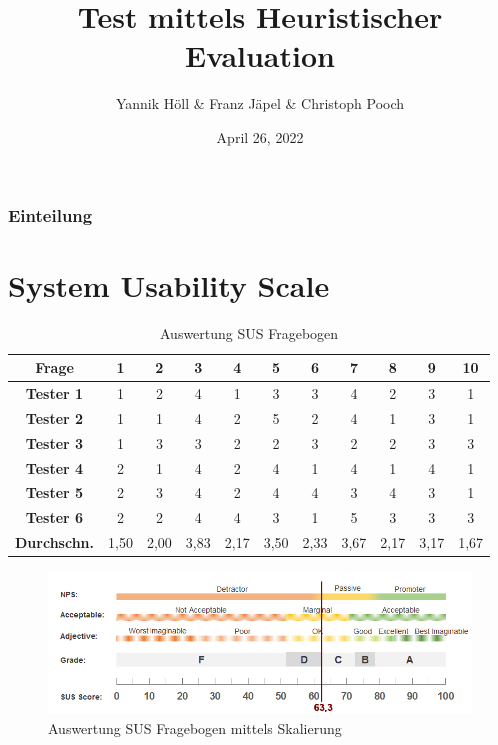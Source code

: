 \documentclass[12pt, aspectratio=169]{beamer}
\title{Test mittels Heuristischer Evaluation}
\author[Y. Höll, F. Jäpel, C. Pooch]{Yannik Höll \& Franz Jäpel \& Christoph Pooch}
\date{April 26, 2022}
\begin{document}
\begin{frame}
	\titlepage
\end{frame}

\begin{frame}
	\frametitle{Einteilung}
	\tableofcontents
\end{frame}

\section{System Usability Scale}
\begin{frame}
\begin{center}
	\begin{table}	
	\begin{tabular}{|c|c|c|c|c|c|c|c|c|c|c|}
	\hline
	\textbf{Frage}& \textbf{1}& \textbf{2} & \textbf{3} & \textbf{4} & \textbf{5} & \textbf{6} & \textbf{7} & \textbf{8} & \textbf{9} & \textbf{10} \\ \hline
	\textbf{Tester 1}&1	&2 &4 &1 &3	&3 &4 &2 &3	&1 \\ \hline
	\textbf{Tester 2}&1	&1 &4 &2 &5 &2 &4 &1 &3 &1 \\ \hline
	\textbf{Tester 3}&1	&3 &3 &2 &2 &3 &2 &2 &3 &3 \\ \hline
	\textbf{Tester 4}&2	&1 &4 &2 &4 &1 &4 &1 &4 &1 \\ \hline
	\textbf{Tester 5}&2	&3 &4 &2 &4 &4 &3 &4 &3 &1 \\ \hline
	\textbf{Tester 6}&2	&2 &4 &4 &3 &1 &5 &3 &3	&3 \\ \hline
	\textbf{Durchschn.}&1,50 &2,00 &3,83 &2,17 &3,50 &2,33 &3,67 &2,17 &3,17 &1,67 \\ \hline
		\end{tabular}
	\caption{Auswertung SUS Fragebogen}
	\end{table}
\end{center}
\end{frame}

\begin{frame}
	\begin{figure}	
		\includegraphics[width=1\textwidth]{image/sus-scale-nocorrect.png}
		\caption{Auswertung SUS Fragebogen mittels Skalierung}
	\end{figure}
\end{frame}
\end{document}
